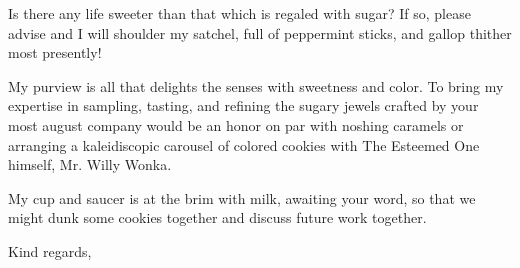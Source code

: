 
Is there any life sweeter than that which is regaled with sugar?  If so, please advise and I will shoulder my satchel, full of peppermint sticks,
and gallop thither most presently!

My purview is all that delights the senses with sweetness and color.  To bring my expertise in sampling, tasting, and refining the sugary jewels
crafted by your most august company would be an honor on par with noshing caramels or arranging a kaleidiscopic carousel of colored cookies with The 
Esteemed One himself, Mr. Willy Wonka.

My cup and saucer is at the brim with milk, awaiting your word, so that we might dunk some cookies together and discuss future work together.

\closing{Kind regards,}


